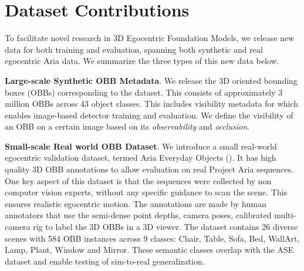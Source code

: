 \section{Dataset Contributions}
\label{sec:dataset}



To facilitate novel research in 3D Egocentric Foundation Models, we release new data for both training and evaluation, spanning both synthetic and real egocentric Aria data. We summarize the three types of this new data below.

\noindent\textbf{Large-scale Synthetic OBB Metadata}. We release the 3D oriented bounding boxes (OBBs) corresponding to the \ASE{} dataset. This consists of approximately 3 million OBBs across 43 object classes. This includes visibility metadata for \ASE{} which enables image-based detector training and evaluation. We define the visibility of an OBB on a certain image based on its \textit{observability} and \textit{occlusion}.

\noindent\textbf{Small-scale Real world OBB Dataset}. We introduce a small real-world egocentric validation dataset, termed Aria Everyday Objects (\AOThree{}). It has high quality 3D OBB annotations to allow evaluation on real Project Aria sequences. 
One key aspect of this dataset is that the sequences were collected by non computer vision experts, without any specific guidance to scan the scene. This ensures realistic egocentric motion. 
%
%
The annotations are made by human annotators that use the semi-dense point depths, camera poses, calibrated multi-camera rig to label the 3D OBBs in a 3D viewer. 
%
%
The dataset contains 26 diverse scenes with 584 OBB instances across 9 classes: Chair, Table, Sofa, Bed, WallArt, Lamp, Plant, Window and Mirror. These semantic classes overlap with the ASE dataset and enable testing of sim-to-real generalization.

